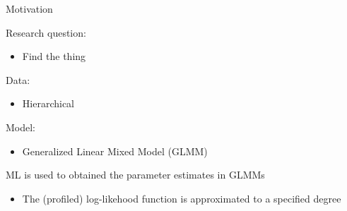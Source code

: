 \documentclass{beamer}
\begin{document}

%
%








\begin{frame}{Motivation}


Research question:
\begin{itemize}
\item Find the thing
\end{itemize}
Data:
\begin{itemize}
\item Hierarchical
\end{itemize}
Model:
\begin{itemize}
\item Generalized Linear Mixed Model (GLMM)
\end{itemize}
\vspace{5mm}



\begin{block}

ML is used to obtained the parameter estimates in GLMMs
\begin{itemize}
\item The (profiled) log-likehood function is approximated to a specified degree
\end{itemize}


\end{block}


\end{frame}


\end{document}
